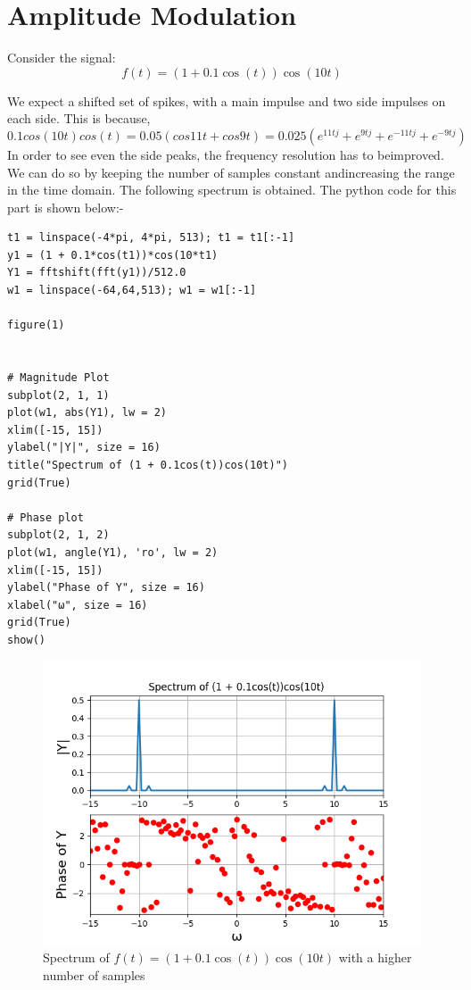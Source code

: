 \documentclass{article}
\begin{document}
\section{Amplitude Modulation}
Consider the signal:\newline
\begin{equation}
f(t) = (1+0.1\cos(t))\cos(10t)    
\end{equation}

We  expect  a  shifted  set  of  spikes,  with  a  main  impulse  and  two  side impulses on each side.  This is because,
\begin{equation}
    0.1cos(10t)cos(t) = 0.05(cos11t+cos9t)= 0.025(e^{11tj}+e^{9tj}+e^{-11tj}+e^{-9tj})
\end{equation}
In  order  to  see  even  the  side  peaks,  the  frequency  resolution  has  to  beimproved.  We can do so by keeping the number of samples constant andincreasing the range in the time domain.  The following spectrum is obtained.
The python code for this part is shown below:-
\begin{lstlisting}
t1 = linspace(-4*pi, 4*pi, 513); t1 = t1[:-1] 
y1 = (1 + 0.1*cos(t1))*cos(10*t1) 
Y1 = fftshift(fft(y1))/512.0  
w1 = linspace(-64,64,513); w1 = w1[:-1]

figure(1)


# Magnitude Plot
subplot(2, 1, 1)
plot(w1, abs(Y1), lw = 2)
xlim([-15, 15])
ylabel("|Y|", size = 16)
title("Spectrum of (1 + 0.1cos(t))cos(10t)")
grid(True)

# Phase plot 
subplot(2, 1, 2)
plot(w1, angle(Y1), 'ro', lw = 2)
xlim([-15, 15])
ylabel("Phase of Y", size = 16)
xlabel("ω", size = 16)
grid(True)
show()
\end{lstlisting}
\begin{figure}[h!]
\centering
\includegraphics[scale=0.6]{Ass8_Figure_3.png}
\caption{Spectrum of $f(t) = (1+0.1\cos(t))\cos(10t)$ with a higher number of samples}
\label{fig:universe}
\end{figure}
\clearpage
\end{document}

